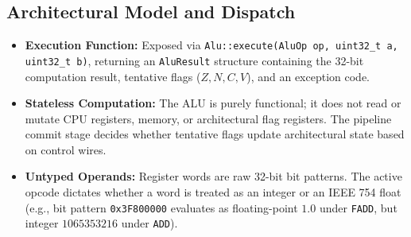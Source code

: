 \documentclass[11pt,a4paper]{article}
\begin{document}
\subsection{Architectural Model and Dispatch}
\begin{itemize}
    \item \textbf{Execution Function:} Exposed via \texttt{Alu::execute(AluOp op, uint32\_t a, uint32\_t b)}, returning an \texttt{AluResult} structure containing the 32-bit computation result, tentative flags ($Z, N, C, V$), and an exception code.
    \item \textbf{Stateless Computation:} The ALU is purely functional; it does not read or mutate CPU registers, memory, or architectural flag registers. The pipeline commit stage decides whether tentative flags update architectural state based on control wires.
    \item \textbf{Untyped Operands:} Register words are raw 32-bit bit patterns. The active opcode dictates whether a word is treated as an integer or an IEEE 754 float (e.g., bit pattern \texttt{0x3F800000} evaluates as floating-point $1.0$ under \texttt{FADD}, but integer $1065353216$ under \texttt{ADD}).
\end{itemize}
\end{document}
